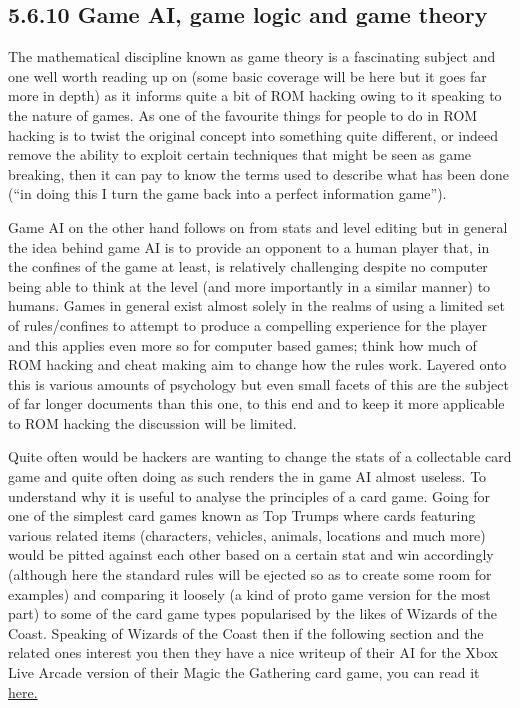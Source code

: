 \documentclass[
]{book}
\begin{document}
\hypertarget{game-ai-game-logic-and-game-theory}{%
\subsection{5.6.10 Game AI, game logic and game theory}\label{game-ai-game-logic-and-game-theory}}

The mathematical discipline known as game theory is a fascinating subject and one well worth reading up on (some basic coverage will be here but it goes far more in depth) as it informs quite a bit of ROM hacking owing to it speaking to the nature of games. As one of the favourite things for people to do in ROM hacking is to twist the original concept into something quite different, or indeed remove the ability to exploit certain techniques that might be seen as game breaking, then it can pay to know the terms used to describe what has been done (``in doing this I turn the game back into a perfect information game'').

Game AI on the other hand follows on from stats and level editing but in general the idea behind game AI is to provide an opponent to a human player that, in the confines of the game at least, is relatively challenging despite no computer being able to think at the level (and more importantly in a similar manner) to humans. Games in general exist almost solely in the realms of using a limited set of rules/confines to attempt to produce a compelling experience for the player and this applies even more so for computer based games; think how much of ROM hacking and cheat making aim to change how the rules work. Layered onto this is various amounts of psychology but even small facets of this are the subject of far longer documents than this one, to this end and to keep it more applicable to ROM hacking the discussion will be limited.

Quite often would be hackers are wanting to change the stats of a collectable card game and quite often doing as such renders the in game AI almost useless. To understand why it is useful to analyse the principles of a card game. Going for one of the simplest card games known as Top Trumps where cards featuring various related items (characters, vehicles, animals, locations and much more) would be pitted against each other based on a certain stat and win accordingly (although here the standard rules will be ejected so as to create some room for examples) and comparing it loosely (a kind of proto game version for the most part) to some of the card game types popularised by the likes of Wizards of the Coast. Speaking of Wizards of the Coast then if the following section and the related ones interest you then they have a nice writeup of their AI for the Xbox Live Arcade version of their Magic the Gathering card game, you can read it \href{http://archive.wizards.com/Magic/Magazine/Article.aspx?x=mtg/daily/feature/44}{here.}
\end{document}
